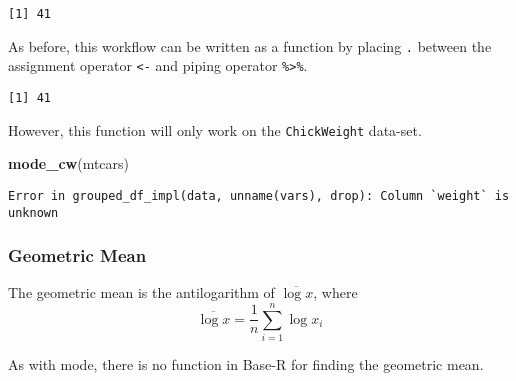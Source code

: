 \documentclass[12pt,]{article}
\newenvironment{Shaded}{\begin{snugshade}}{\end{snugshade}}
\newcommand{\DataTypeTok}[1]{\textcolor[rgb]{0.13,0.29,0.53}{#1}}
\newcommand{\DecValTok}[1]{\textcolor[rgb]{0.00,0.00,0.81}{#1}}
\newcommand{\KeywordTok}[1]{\textcolor[rgb]{0.13,0.29,0.53}{\textbf{#1}}}
\newcommand{\NormalTok}[1]{#1}
\newcommand{\OperatorTok}[1]{\textcolor[rgb]{0.81,0.36,0.00}{\textbf{#1}}}
\newcommand{\OtherTok}[1]{\textcolor[rgb]{0.56,0.35,0.01}{#1}}
\newcommand{\StringTok}[1]{\textcolor[rgb]{0.31,0.60,0.02}{#1}}
\begin{document}
\begin{verbatim}
[1] 41
\end{verbatim}

As before, this workflow can be written as a function by placing
\texttt{.} between the assignment operator \texttt{\textless{}-} and
piping operator \texttt{\%\textgreater{}\%}.

\begin{Shaded}
\end{Shaded}

\begin{verbatim}
[1] 41
\end{verbatim}

However, this function will only work on the \texttt{ChickWeight}
data-set.

\begin{Shaded}
\begin{Highlighting}[]
\KeywordTok{mode_cw}\NormalTok{(mtcars)}
\end{Highlighting}
\end{Shaded}

\begin{verbatim}
Error in grouped_df_impl(data, unname(vars), drop): Column `weight` is unknown
\end{verbatim}

\hypertarget{geometric-mean}{%
\subsubsection{Geometric Mean}\label{geometric-mean}}

The geometric mean is the antilogarithm of \(\overline{\log x}\), where
\[\overline{\log x}= \frac{1}{n}\sum^n_{i=1}\log{x_i}\]

As with mode, there is no function in Base-R for finding the geometric
mean.
\end{document}
